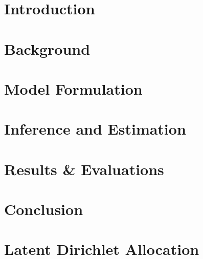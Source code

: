 \documentclass[master,final,11pt]{iscs-thesis}
\date{\today}
\begin{document}
\begin{eabstract}

\end{eabstract}
\begin{jabstract}

\end{jabstract}
\maketitle
\switchinterim
\switchenglish
\frontmatter %
\tableofcontents %
\listoffigures %
\listoftables %
\listofalgorithms
\mainmatter %
\titlepage
\chapter{Introduction}\label{ch1}



\chapter{Background}\label{ch2}

\chapter{Model Formulation}\label{ch3}

\chapter{Inference and Estimation}\label{ch4}

\chapter{Results \& Evaluations}\label{ch5}

\chapter{Conclusion}\label{ch6}

\cite{wallach_rethinking_nodate}
\appendix
\chapter{Latent Dirichlet Allocation}

\end{document}
